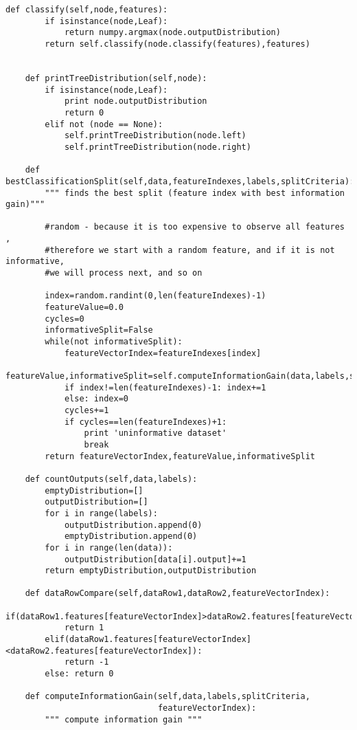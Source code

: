 \begin{lstlisting}[style=python,caption=Classification tree]
    def classify(self,node,features):        
        if isinstance(node,Leaf):
            return numpy.argmax(node.outputDistribution)
        return self.classify(node.classify(features),features)
        
    
    def printTreeDistribution(self,node):
        if isinstance(node,Leaf):
            print node.outputDistribution
            return 0
        elif not (node == None):
            self.printTreeDistribution(node.left)
            self.printTreeDistribution(node.right)
            
    def bestClassificationSplit(self,data,featureIndexes,labels,splitCriteria):
    	""" finds the best split (feature index with best information gain)"""

    	#random - because it is too expensive to observe all features ,
    	#therefore we start with a random feature, and if it is not informative,
    	#we will process next, and so on

        index=random.randint(0,len(featureIndexes)-1)
        featureValue=0.0
        cycles=0
        informativeSplit=False
        while(not informativeSplit):
            featureVectorIndex=featureIndexes[index]
            featureValue,informativeSplit=self.computeInformationGain(data,labels,splitCriteria,featureVectorIndex)        
            if index!=len(featureIndexes)-1: index+=1
            else: index=0
            cycles+=1
            if cycles==len(featureIndexes)+1:
                print 'uninformative dataset'            
                break
        return featureVectorIndex,featureValue,informativeSplit
        
    def countOutputs(self,data,labels):        
        emptyDistribution=[]        
        outputDistribution=[]
        for i in range(labels):
            outputDistribution.append(0)
            emptyDistribution.append(0)
        for i in range(len(data)):
            outputDistribution[data[i].output]+=1
        return emptyDistribution,outputDistribution
        
    def dataRowCompare(self,dataRow1,dataRow2,featureVectorIndex):
        if(dataRow1.features[featureVectorIndex]>dataRow2.features[featureVectorIndex]):
            return 1
        elif(dataRow1.features[featureVectorIndex]<dataRow2.features[featureVectorIndex]):
            return -1
        else: return 0
    
    def computeInformationGain(self,data,labels,splitCriteria,
                               featureVectorIndex):
    	""" compute information gain """


\end{lstlisting}
